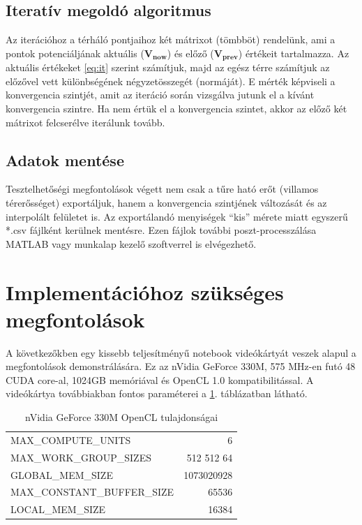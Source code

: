 	
\subsection{Iteratív megoldó algoritmus}
	Az iterációhoz a térháló pontjaihoz két mátrixot (tömbböt) rendelünk, ami a
	pontok potenciáljának aktuális ($\mathbf{V_{now}}$) és előző ($\mathbf{V_{prev}}$)
	értékeit tartalmazza.
	Az aktuális értékeket \eqref{eq:it} szerint számítjuk, majd az egész térre
	számítjuk az előzővel vett különbségének négyzetösszegét (normáját). E mérték
	képviseli a konvergencia szintjét, amit az iteráció során vizsgálva jutunk el a
	kívánt konvergencia szintre.
	Ha nem értük el a konvergencia szintet, akkor az előző két mátrixot
	felcserélve iterálunk tovább.
	
\subsection{Adatok mentése}
	Tesztelhetőségi megfontolások végett nem csak a tűre ható erőt (villamos
	térerősséget) exportáljuk, hanem a konvergencia szintjének változását és az
	interpolált felületet is. Az exportálandó menyiségek ``kis''
	mérete miatt egyszerű *.csv fájlként kerülnek mentésre. Ezen fájlok további
	poszt-processzálása MATLAB vagy munkalap kezelő szoftverrel is elvégezhető.

\section{Implementációhoz szükséges megfontolások}
	
	A következőkben egy kissebb teljesítményű notebook videókártyát veszek
	alapul a megfontolások demonstrálására. Ez az nVidia GeForce 330M, 
	575 MHz-en futó 48 CUDA core-al, 1024GB memóriával és
	OpenCL 1.0 kompatibilitással.
	A videókártya továbbiakban fontos paraméterei a \ref{table:vcard}. táblázatban
	látható.
	
	\begin{table}[!h]
	\renewcommand{\arraystretch}{1.3}
	\caption{nVidia GeForce 330M OpenCL tulajdonságai}
	\label{table:vcard}
	\centering
	\begin{tabular}{l|r}
		MAX\_COMPUTE\_UNITS & 6\\
		MAX\_WORK\_GROUP\_SIZES & 512 512 64\\
		GLOBAL\_MEM\_SIZE & 1073020928\\
		MAX\_CONSTANT\_BUFFER\_SIZE & 65536\\
		LOCAL\_MEM\_SIZE & 16384
	\end{tabular}
	\end{table}
	
